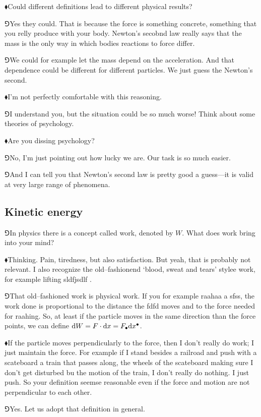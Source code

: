 \documentclass[10pt,oneside%
]{memoir}
\newcommand{\dd}{\mathrm{d}}
\newcommand{\coa}{{\color{black}\bullet}}
\newcommand{\hea}{\(\blacklozenge\)\;}
\newcommand{\heb}{\(\Game\)\;}
\begin{document}
\hea Could different definitions lead to different physical results?

\heb Yes they could. That is because the force is something concrete, something that you relly produce with your body. Newton's secobnd law really says that the mass is the only way in which bodies reactions to force differ.

\heb We could for example let the mass depend on the acceleration. And that dependence could be different for different particles. We just guess the Newton's second.

\hea I'm not perfectly comfortable with this reasoning.

\heb I understand you, but the situation could be so much worse! Think about some theories of psychology.

\hea Are you dissing psychology?

\heb No, I'm just pointing out how lucky we are. Our task is so much easier.

\heb And I can tell you that Newton's second law is pretty good a guess---it is valid at very large range of phenomena.
\subsection{Kinetic energy}
\heb In physics there is a concept called work, denoted by \(W\). What does work bring into your mind?

\hea Thinking. Pain, tiredness, but also satisfaction. But yeah, that is probably not relevant. I also recognize the old--fashionend `blood, sweat and tears' stylee work, for example lifting sldfjsdlf .

\heb That old--fashioned work is physical work. If you for example raahaa a sfss, the work done is proportional to the distance the fdfd moves and to the force needed for raahing. So, at least if the particle moves in the same direction than the force points, we can define \(\dd W=F\cdot\dd x=F_\coa\dd x^\coa\).

\hea If the particle moves perpendicularly to the force, then I don't really do work; I just maintain the force. For example if I stand besides a railroad and push with a scateboard a train that passes along, the wheels of the scateboard making sure I don't get disturbed bu the motion of the train, I don't really do nothing. I just push. So your definition seemse reasonable even if the force and motion are not perpendicular to each other.

\heb Yes. Let us adopt that definition in general.
\end{document}
